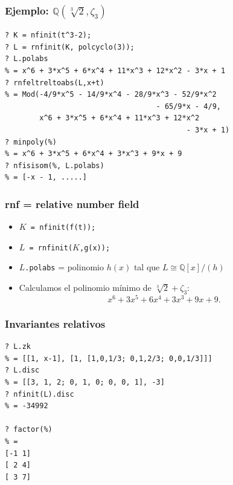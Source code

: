 \documentclass{beamer}
\newcommand{\QQ}{\mathbb{Q}}
\begin{document}
\begin{frame}[fragile]
  \frametitle{Ejemplo: $\QQ (\sqrt[3]{2},\zeta_3)$}
  \begin{shaded}\small
\begin{verbatim}
? K = nfinit(t^3-2);
? L = rnfinit(K, polcyclo(3));
? L.polabs
% = x^6 + 3*x^5 + 6*x^4 + 11*x^3 + 12*x^2 - 3*x + 1
? rnfeltreltoabs(L,x+t)
% = Mod(-4/9*x^5 - 14/9*x^4 - 28/9*x^3 - 52/9*x^2
                                   - 65/9*x - 4/9,
        x^6 + 3*x^5 + 6*x^4 + 11*x^3 + 12*x^2
                                          - 3*x + 1)
? minpoly(%)
% = x^6 + 3*x^5 + 6*x^4 + 3*x^3 + 9*x + 9
? nfisisom(%, L.polabs)
% = [-x - 1, .....]
\end{verbatim}
  \end{shaded}
\end{frame}


\begin{frame}[fragile]
  \frametitle{rnf = relative number field}

  \begin{itemize}
  \item \texttt{$K$ = nfinit(f(t));}
  \item \texttt{$L$ = rnfinit($K$,g(x));}
  \item \texttt{$L$.polabs} = polinomio $h (x)$ tal que $L \cong \QQ[x]/(h)$
  \item Calculamos el polinomio mínimo de $\sqrt[3]{2} + \zeta_3$:
    $$x^6 + 3 x^5 + 6 x^4 + 3 x^3 + 9 x + 9.$$
  \end{itemize}
\end{frame}


\begin{frame}[fragile]
  \frametitle{Invariantes relativos}

  \begin{shaded}\small
\begin{verbatim}
? L.zk
% = [[1, x-1], [1, [1,0,1/3; 0,1,2/3; 0,0,1/3]]]
? L.disc
% = [[3, 1, 2; 0, 1, 0; 0, 0, 1], -3]
? nfinit(L).disc
% = -34992

? factor(%)
% = 
[-1 1]
[ 2 4]
[ 3 7]
\end{verbatim}
  \end{shaded}
\end{frame}

\end{document}
